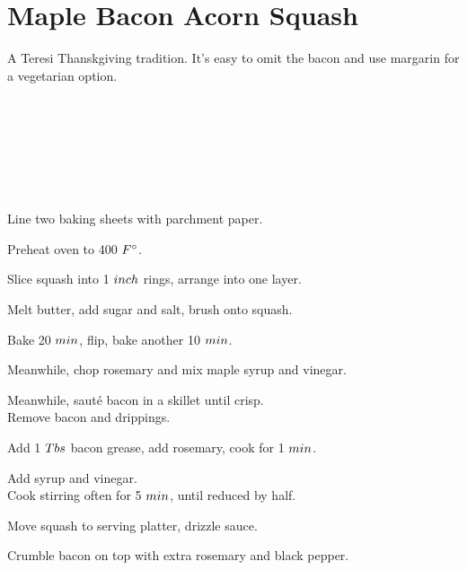 \section[Acorn Squash]{Maple Bacon Acorn Squash}

\begin{recipestats}[
        servings=12,
        preptime=15~\minute,
        bakingtime=40~\minute,
        source=Pamela Teresi,
        original=\citefield{squashCountryLiving2014}{journaltitle}~\cite{squashCountryLiving2014},
    ]
\end{recipestats}

\begin{recipeabstract}
    A Teresi Thanskgiving tradition.
    It's easy to omit the bacon and use margarin for a vegetarian option.
\end{recipeabstract}

\begin{ingredientcolumns}
    \begin{ingredientblock}
        \\
        \\
        \\
    \end{ingredientblock}
    \begin{ingredientblock}
        \\
        \\
    \end{ingredientblock}
\end{ingredientcolumns}

\begin{preparation}
\item Line two baking sheets with parchment paper.
\item Preheat oven to 400 $\Fahrenheit$.
\item Slice squash into 1 $\inch$ rings, arrange into one layer.
\item Melt butter, add sugar and salt, brush onto squash.
\item Bake 20 $\minute$, flip, bake another 10 $\minute$.
\item Meanwhile, chop rosemary and mix maple syrup and vinegar.
\item Meanwhile, saut\'{e} bacon in a skillet until crisp.\\
    Remove bacon and drippings.
\item Add 1 $\Tablespoon$ bacon grease, add rosemary, cook for 1 $\minute$.
\item Add syrup and vinegar.\\
    Cook stirring often for 5 $\minute$, until reduced by half.
\item Move squash to serving platter, drizzle sauce.
\item Crumble bacon on top with extra rosemary and black pepper.
\end{preparation}

\recipeend%

